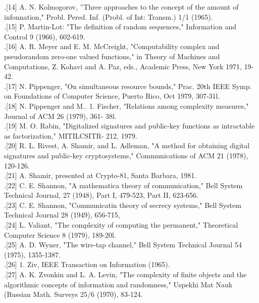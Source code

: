 \documentclass[]{article}
\begin{document}
.[14] A. N. Kolmogorov, ''Three approaches to the concept of the
amount of infonnation," Probl. Pered. Inf. (Probl. of Int: Transm.)
1/1 (1965).\\
.[15] P. Martin-Lot: "The definition of random sequences," Information
and Control 9 (1966), 602-619.\\
.[16] A. R. Meyer and E. M. McCreight, "Computability complex and
pseudorandom zero-one valued functions," in Theory of Machines and
Computations, Z. Kohavi and A. Paz, eds., Academic Press, New York
1971, 19-42.\\
.[17] N. Pippenger, "On simultaneous resource bounds," Prac. 20th
IEEE Symp. on Foundations of Computer Science, Puerto Rico, Oct
1979, 307-31l.\\
.[18] N. Pippenger and M.. 1. Fischer, "Relations among complexity
measures," Journal of ACM 26 (1979), 361- 38l.\\
.[19] M. O. Rabin, "Digitalized signatures and public-key functions as
intractable as factorization," MITILCSITR- 212, 1979.\\
.[20] R. L. Rivest, A. Shamir, and L. Adleman, "A method for obtaining
digital signatures and public-key cryptosystems," Communications of
ACM 21 (1978), 120-126.\\
.[21] A. Shamir, presented at Crypto-81, Santa Barbara, 1981.\\
.[22] C. E. Shannon, "A mathematica theory of communication," Bell
System Technical Journal, 27 (1948), Part I, 479-523, Part II, 623-656.\\
.[23] C. E. Shannon, "Communicatin theory of secrecy systems," Bell
System Technical Journal 28 (1949), 656-715,\\
.[24] L. Valiant, "The complexity of computing the permanent," Theoretical
Computer Science 8 (1979), 189-20l.\\
.[25] A. D. Wyner, "The wire-tap channel," Bell System Technical
Journal 54 (1975), 1355-1387.\\
.[26] 1. Ziv, IEEE Transaction on Information (1965).\\
.[27] A. K. Zvonkin and L. A. Levin, "The complexity of finite objects
and the algorithmic concepts of information and randomness," Uspekhi
Mat Nauk (Russian Math. Surveys 25/6 (1970), 83-124.
\end{document}
